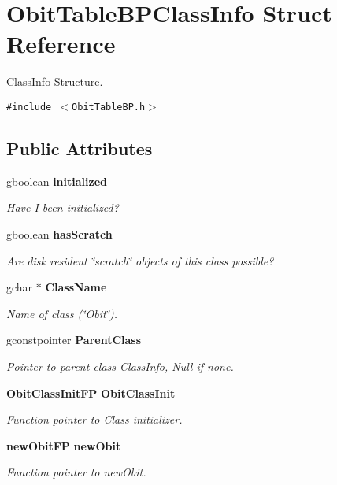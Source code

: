 \section{Obit\-Table\-BPClass\-Info Struct Reference}
\label{structObitTableBPClassInfo}
Class\-Info Structure.  


{\tt \#include $<$Obit\-Table\-BP.h$>$}

\subsection*{Public Attributes}
\begin{CompactItemize}
\item 
gboolean {\bf initialized}
\begin{CompactList}\small\item\em Have I been initialized? \item\end{CompactList}\item 
gboolean {\bf has\-Scratch}
\begin{CompactList}\small\item\em Are disk resident \char`\"{}scratch\char`\"{} objects of this class possible? \item\end{CompactList}\item 
gchar $\ast$ {\bf Class\-Name}
\begin{CompactList}\small\item\em Name of class (\char`\"{}Obit\char`\"{}). \item\end{CompactList}\item 
gconstpointer {\bf Parent\-Class}
\begin{CompactList}\small\item\em Pointer to parent class Class\-Info, Null if none. \item\end{CompactList}\item 
{\bf Obit\-Class\-Init\-FP} {\bf Obit\-Class\-Init}
\begin{CompactList}\small\item\em Function pointer to Class initializer. \item\end{CompactList}\item 
{\bf new\-Obit\-FP} {\bf new\-Obit}
\begin{CompactList}\small\item\em Function pointer to new\-Obit. \item\end{CompactList}\item 

\end{CompactItemize}
